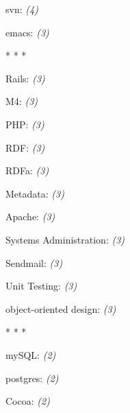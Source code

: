 \documentclass[]{article}
\begin{document}
       

 svn: \emph{(4)}
  \label{svn4}

       

 emacs: \emph{(3)}
  \label{emacs3}

       

 \begin{center}* * * \end{center}
 Rails: \emph{(3)}
  \label{rails3}

       

 M4: \emph{(3)}
  \label{m43}

       

 PHP: \emph{(3)}
  \label{php3}

       

 RDF: \emph{(3)}
  \label{rdf3}

       

 RDFa: \emph{(3)}
  \label{rdfa3}

       

 Metadata: \emph{(3)}
  \label{metadata3}

       

 Apache: \emph{(3)}
  \label{apache3}

       

 Systems Administration: \emph{(3)}
  \label{systemsadministration3}

       

 Sendmail: \emph{(3)}
  \label{sendmail3}

       

 Unit Testing: \emph{(3)}
  \label{unittesting3}

       

 object-oriented design: \emph{(3)}
  \label{object-orienteddesign3}

       

 \begin{center}* * * \end{center}
 mySQL: \emph{(2)}
  \label{mysql2}

       

 postgres: \emph{(2)}
  \label{postgres2}

       

 Cocoa: \emph{(2)}
  \label{cocoa2}

       
\end{document}
